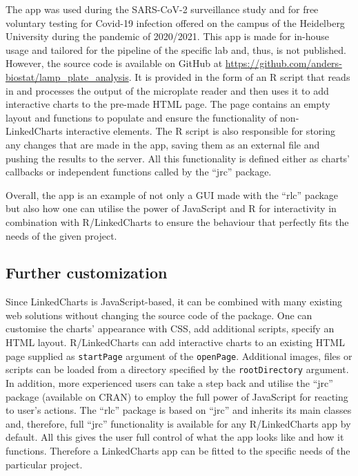 \documentclass[twocolumn,10pt]{article}
\begin{document}
The app was used during the SARS-CoV-2 surveillance study \citep{deckert_2021} and for free voluntary testing for Covid-19 infection offered on the campus of the Heidelberg University during the pandemic of 2020/2021. This app is made for in-house usage and tailored for the pipeline of the specific lab and, thus, is not published. However, the source code is available on GitHub at \url{https://github.com/anders-biostat/lamp_plate_analysis}. It is provided in the form of an R script that reads in and processes the output of the microplate reader and then uses it to add interactive charts to the pre-made HTML page. The page contains an empty layout and functions to populate and ensure the functionality of non-LinkedCharts interactive elements. The R script is also responsible for storing any changes that are made in the app, saving them as an external file and pushing the results to the server. All this functionality is defined either as charts' callbacks or independent functions called by the ``jrc'' package.

Overall, the app is an example of not only a GUI made with the ``rlc'' package but also how one can utilise the power of JavaScript and R for interactivity in combination with R/LinkedCharts to ensure the behaviour that perfectly fits the needs of the given project.

\subsection{Further customization}

Since LinkedCharts is JavaScript-based, it can be combined with many existing web solutions without changing the source code of the package. One can customise the charts' appearance with CSS, add additional scripts, specify an HTML layout. R/LinkedCharts can add interactive charts to an existing HTML page supplied as \texttt{startPage} argument of the \texttt{openPage}. Additional images, files or scripts can be loaded from a directory specified by the \texttt{rootDirectory} argument. In addition, more experienced users can take a step back and utilise the ``jrc'' package (available on CRAN) to employ the full power of JavaScript for reacting to user's actions. The ``rlc'' package is based on ``jrc'' and inherits its main classes and, therefore, full ``jrc'' functionality is available for any R/LinkedCharts app by default. All this gives the user full control of what the app looks like and how it functions. Therefore a LinkedCharts app can be fitted to the specific needs of the particular project.
\end{document}
